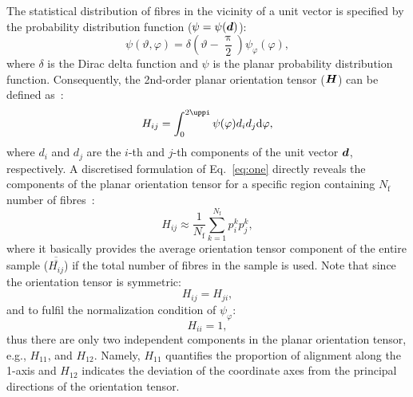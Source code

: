 	The statistical distribution of fibres in the vicinity of a unit vector is specified by the probability distribution function ($\psi=\psi(\tena{d})$):
	\begin{equation}
	\psi(\vartheta,\varphi)=\delta(\vartheta-\frac{\uppi}{2})\psi_\varphi(\varphi),
	\end{equation}
	where $\delta$ is the Dirac delta function and $\psi$ is the planar probability distribution function. Consequently, the 2nd-order planar orientation tensor ($\tenb{H}$) can be defined as~\autocite{Advani.1987}:
\begin{equation}\label{eq:one}
H_{ij}=\int_{0}^{2\uppi}\psi(\varphi)d_id_j \dif\varphi,
\end{equation}
where $d_i$ and $d_j$ are the $i$-th and $j$-th components of the unit vector $\tena{d}$, respectively. A discretised formulation of Eq.~\eqref{eq:one} directly reveals the components of the planar orientation tensor for a specific region containing $N_\text{f}$ number of fibres~\autocite{Ranganathan.1990}:
\begin{equation}
H_{ij}\approx\frac{1}{N_\text{f}}\sum_{k=1}^{N_\text{f}}p_i^kp_j^k,
\end{equation}
where it basically provides the average orientation tensor component of the entire sample ($\overline{\overline{H_{ij}}}$) if the total number of fibres in the sample is used. Note that since the orientation tensor is symmetric:
\begin{equation}
H_{ij}=H_{ji},
\end{equation}
and to fulfil the normalization condition of $\psi_\varphi$:
\begin{equation}
H_{ii}=1,
\end{equation}
thus there are only two independent components in the planar orientation tensor, e.g., $H_{11}$, and $H_{12}$. Namely, $H_{11}$ quantifies the proportion of alignment along the 1-axis and $H_{12}$ indicates the deviation of the coordinate axes from the principal directions of the orientation tensor.


